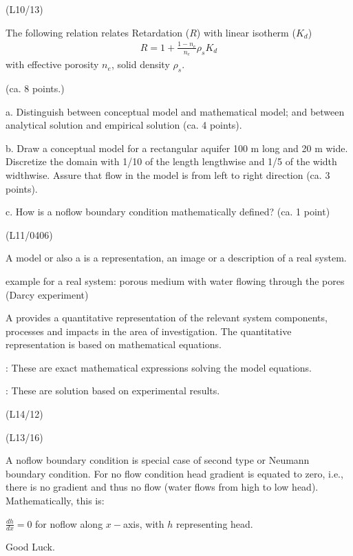 \documentclass[letterpaper,10pt,english]{sphinxmanual}
\let\sphinxpxdimen\pdfpxdimen\else\newdimen\sphinxpxdimen
\begin{document}
\noindent{}

(L10/13)

The following relation relates Retardation (\(R\)) with linear isotherm (\(K_d\))
\begin{equation*}
\begin{split}
R = 1+ \frac{1-n_e}{n_e}\rho_s K_d
\end{split}
\end{equation*}
with effective porosity \(n_e\), solid density \(\rho_s\).

 (ca. 8 points.)

a. Distinguish between conceptual model and mathematical model; and between analytical solution and empirical solution (ca. 4 points).

b. Draw a conceptual model for a rectangular aquifer 100 m long and 20 m wide. Discretize the domain with 1/10 of the length length\sphinxhyphen{}wise and 1/5 of the width width\sphinxhyphen{}wise. Assure that flow in the model is from left to right direction (ca. 3 points).

c. How is a no\sphinxhyphen{}flow boundary condition mathematically defined? (ca. 1 point)

(L11/04\sphinxhyphen{}06)

A model or also a  is a representation, an image or a description of a real system.

example for a real system: porous medium with water flowing through the pores (Darcy experiment)

A  provides a quantitative representation of the relevant system components, processes and impacts in the area of investigation. The quantitative representation is based on mathematical equations.

 : These are exact mathematical expressions solving the model equations.

 : These are solution based on experimental results.

 \sphinxhyphen{} (L14/12)

\noindent\sphinxincludegraphics[width=500\sphinxpxdimen]{{Q9b_2019-2020}.png}

(L13/16)

A no\sphinxhyphen{}flow boundary condition is special case of second type or Neumann boundary condition. For no flow condition head gradient is equated to zero, i.e., there is no gradient and thus no flow (water flows from high to low head). Mathematically, this is:

\(\frac{dh}{dx} = 0 \) for no\sphinxhyphen{}flow along \(x-\)axis, with \(h\) representing head.

Good Luck.







\renewcommand{\indexname}{Index}
\printindex
\end{document}
